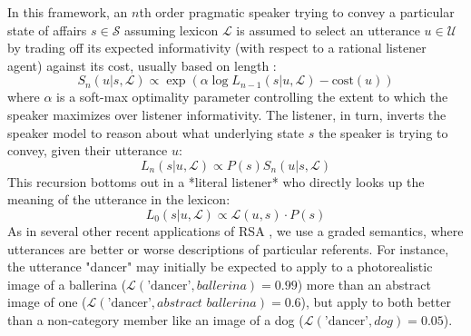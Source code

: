 In this framework, an $n$th order pragmatic speaker trying to convey a particular state of affairs $s \in \mathcal{S}$ assuming lexicon $\mathcal{L}$ is assumed to select an utterance $u \in \mathcal{U}$ by trading off its expected informativity (with respect to a rational listener agent) against its cost, usually based on length \cite{GoodmanFrank16_RSATiCS}:
$$S_n(u | s, \mathcal{L}) \propto \exp{\left(\alpha \log L_{n-1}(s | u, \mathcal{L}) - \textrm{cost}(u)\right)}$$
where $\alpha$ is a soft-max optimality parameter controlling the extent to which the speaker maximizes over listener informativity. The listener, in turn, inverts the speaker model to reason about what underlying state $s$ the speaker is trying to convey, given their utterance $u$:
$$L_n(s | u, \mathcal{L}) \propto P(s) S_{n}(u | s, \mathcal{L})$$
\indent This recursion bottoms out in a *literal listener* who directly looks up the meaning of the utterance in the lexicon:
$$L_0(s | u, \mathcal{L}) \propto \mathcal{L}(u, s)\cdot P(s)$$
\indent As in several other recent applications of RSA \cite{GrafEtAl16_BasicLevel}, we use a graded semantics, where utterances are better or worse descriptions of particular referents. For instance, the utterance "dancer" may initially be expected to apply to a photorealistic image of a ballerina ($\mathcal{L}(\textrm{'dancer'}, \textit{ballerina}) = 0.99$) more than an abstract image of one ($\mathcal{L}(\textrm{'dancer'}, \textit{abstract ballerina}) =0.6$), but apply to both better than a non-category member like an image of a dog ($\mathcal{L}(\textrm{'dancer'}, \textit{dog}) = 0.05$).

